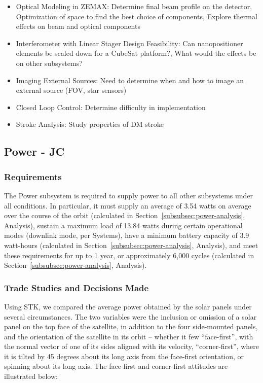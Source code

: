 \documentclass[12pt]{article}
\begin{document}
\begin{itemize}
\item{Optical Modeling in ZEMAX}: Determine final beam profile on the detector, Optimization of 
space to find the best choice of components, Explore thermal effects on beam and optical components

\item{Interferometer with Linear Stager Design Feasibility}: Can nanopositioner elements be scaled down for a CubeSat platform?, What would the effects be on other subsystems?

\item{Imaging External Sources}: Need to determine when and how to image an external source (FOV, star sensors)

\item{Closed Loop Control}: Determine difficulty in implementation

\item{Stroke Analysis}: Study properties of DM stroke

\end{itemize}
			
			
		\subsection{Power - JC}
			\subsubsection{Requirements}
			The Power subsystem is required to supply power to all other subsystems under all conditions.  In particular, it must supply an average of 3.54 watts on average over the course of the orbit (calculated in Section~\ref{subsubsec:power-analysis}, Analysis), sustain a maximum load of 13.84 watts during certain operational modes (downlink mode, per Systems), have a minimum battery capacity of 3.9 watt-hours (calculated in Section~\ref{subsubsec:power-analysis}, Analysis), and meet these requirements for up to 1 year, or approximately 6,000 cycles (calculated in Section~\ref{subsubsec:power-analysis}, Analysis).
			
			\subsubsection{Trade Studies and Decisions Made}
			Using STK, we compared the average power obtained by the solar panels under several circumstances.  The two variables were the inclusion or omission of a solar panel on the top face of the satellite, in addition to the four side-mounted panels, and the orientation of the satellite in its orbit -- whether it few ``face-first'', with the normal vector of one of its sides aligned with its velocity, ``corner-first'', where it is tilted by 45 degrees about its long axis from the face-first orientation, or spinning about its long axis.  The face-first and corner-first attitudes are illustrated below:
			
\end{document}

